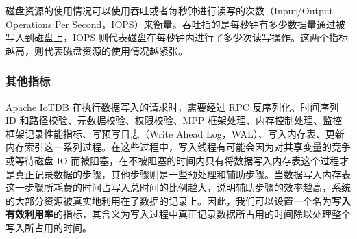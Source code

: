 磁盘资源的使用情况可以使用吞吐或者每秒钟进行读写的次数（Input/Output Operations Per Second，IOPS）来衡量。吞吐指的是每秒钟有多少数据量通过被写入到磁盘上，IOPS 则代表磁盘在每秒钟内进行了多少次读写操作。这两个指标越高，则代表磁盘资源的使用情况越紧张。

\subsubsection{其他指标}
Apache IoTDB 在执行数据写入的请求时，需要经过 RPC 反序列化、时间序列 ID 和路径校验、元数据校验、权限校验、MPP 框架处理、内存控制处理、监控框架记录性能指标、写预写日志（Write Ahead Log，WAL）、写入内存表、更新内存索引这一系列过程。在这些过程中，写入线程有可能会因为对共享变量的竞争或等待磁盘 IO 而被阻塞，在不被阻塞的时间内只有将数据写入内存表这个过程才是真正记录数据的步骤，其他步骤则是一些预处理和辅助步骤。当数据写入内存表这一步骤所耗费的时间占写入总时间的比例越大，说明辅助步骤的效率越高，系统的大部分资源被真实地利用在了数据的记录上。因此，我们可以设置一个名为\textbf{写入有效利用率}的指标，其含义为写入过程中真正记录数据所占用的时间除以处理整个写入所占用的时间。